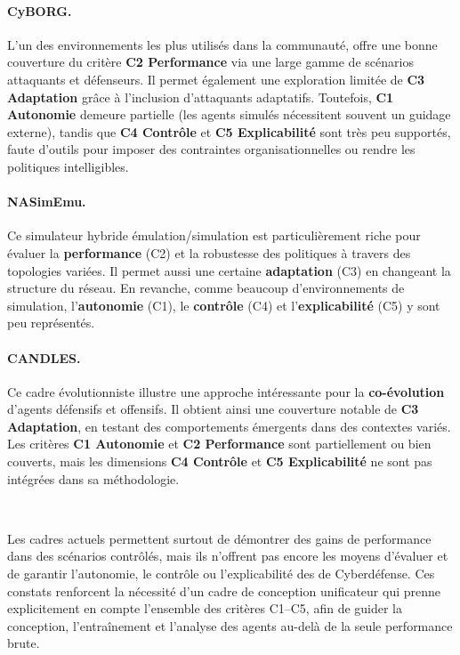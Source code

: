 \paragraph{CyBORG.} L'un des environnements les plus utilisés dans la communauté,  offre une bonne couverture du critère \textbf{C2 Performance} via une large gamme de scénarios attaquants et défenseurs. Il permet également une exploration limitée de \textbf{C3 Adaptation} grâce à l'inclusion d'attaquants adaptatifs. Toutefois, \textbf{C1 Autonomie} demeure partielle (les agents simulés nécessitent souvent un guidage externe), tandis que \textbf{C4 Contrôle} et \textbf{C5 Explicabilité} sont très peu supportés, faute d'outils pour imposer des contraintes organisationnelles ou rendre les politiques intelligibles.

\paragraph{NASimEmu.} Ce simulateur hybride émulation/simulation est particulièrement riche pour évaluer la \textbf{performance} (C2) et la robustesse des politiques à travers des topologies variées. Il permet aussi une certaine \textbf{adaptation} (C3) en changeant la structure du réseau. En revanche, comme beaucoup d'environnements de simulation, l'\textbf{autonomie} (C1), le \textbf{contrôle} (C4) et l'\textbf{explicabilité} (C5) y sont peu représentés.

\paragraph{CANDLES.} Ce cadre évolutionniste illustre une approche intéressante pour la \textbf{co-évolution} d'agents défensifs et offensifs. Il obtient ainsi une couverture notable de \textbf{C3 Adaptation}, en testant des comportements émergents dans des contextes variés. Les critères \textbf{C1 Autonomie} et \textbf{C2 Performance} sont partiellement ou bien couverts, mais les dimensions \textbf{C4 Contrôle} et \textbf{C5 Explicabilité} ne sont pas intégrées dans sa méthodologie.

\

\noindent Les cadres actuels permettent surtout de démontrer des gains de performance dans des scénarios contrôlés, mais ils n'offrent pas encore les moyens d'évaluer et de garantir l'autonomie, le contrôle ou l'explicabilité des  de Cyberdéfense. Ces constats renforcent la nécessité d'un cadre de conception unificateur qui prenne explicitement en compte l'ensemble des critères C1--C5, afin de guider la conception, l'entraînement et l'analyse des agents au-delà de la seule performance brute.

